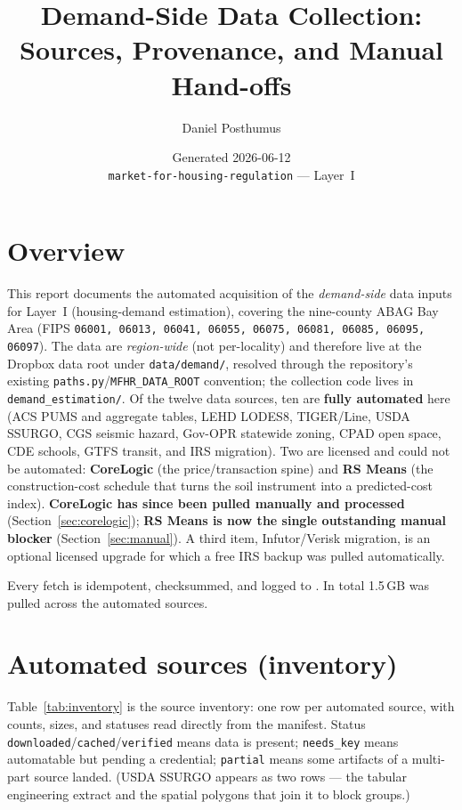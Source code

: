 \documentclass[11pt]{article}
\title{\textbf{Demand-Side Data Collection:\\ Sources, Provenance, and Manual Hand-offs}}
\author{Daniel Posthumus}
\date{Generated 2026-06-12 \\ \texttt{market-for-housing-regulation} --- Layer~I}
\newcommand{\TOTALSIZE}{1.5\,GB}        %
\begin{document}
\maketitle
\tableofcontents
\bigskip

\section{Overview}
This report documents the automated acquisition of the \emph{demand-side} data
inputs for Layer~I (housing-demand estimation), covering the nine-county ABAG
Bay Area (FIPS \texttt{06001, 06013, 06041, 06055, 06075, 06081, 06085, 06095,
06097}). The data are \emph{region-wide} (not per-locality) and therefore live
at the Dropbox data root under \texttt{data/demand/}, resolved through the
repository's existing \texttt{paths.py}/\texttt{MFHR\_DATA\_ROOT} convention; the
collection code lives in \texttt{demand\_estimation/}. Of the twelve data
sources, ten are \textbf{fully automated} here (ACS PUMS and aggregate tables,
LEHD LODES8, TIGER/Line, USDA SSURGO, CGS seismic hazard, Gov-OPR statewide
zoning, CPAD open space, CDE schools, GTFS transit, and IRS migration). Two are
licensed and could not be automated: \textbf{CoreLogic} (the price/transaction
spine) and \textbf{RS Means} (the construction-cost schedule that turns the soil
instrument into a predicted-cost index). \textbf{CoreLogic has since been pulled
manually and processed} (Section~\ref{sec:corelogic}); \textbf{RS Means is now
the single outstanding manual blocker} (Section~\ref{sec:manual}). A third item,
Infutor/Verisk migration, is an optional licensed upgrade for which a free IRS
backup was pulled automatically.

Every fetch is idempotent, checksummed, and logged to
. In total \TOTALSIZE{} was pulled across the
automated sources.

\section{Automated sources (inventory)}
Table~\ref{tab:inventory} is the source inventory: one row per automated source,
with counts, sizes, and statuses read directly from the manifest. Status
\texttt{downloaded}/\texttt{cached}/\texttt{verified} means data is present;
\texttt{needs\_key} means automatable but pending a credential;
\texttt{partial} means some artifacts of a multi-part source landed. (USDA SSURGO
appears as two rows --- the tabular engineering extract and the spatial polygons
that join it to block groups.)
\end{document}
